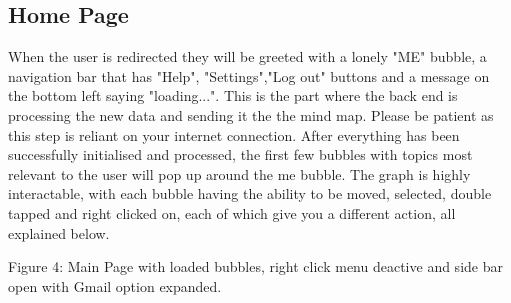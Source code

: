 \documentclass[hidelinks,english]{article}
\begin{document}
	\subsection{Home Page}
	When the user is redirected they will be greeted with a lonely "ME" bubble, a navigation bar that has "Help", "Settings","Log out" buttons and a message on the bottom left saying "loading...". This is the part where the back end is processing the new data and sending it the the mind map. Please be patient as this step is reliant on your internet connection. After everything has been successfully initialised and processed, the first few bubbles with topics most relevant to the user will pop up around the me bubble. The graph is highly interactable, with each bubble having the ability to be moved, selected, double tapped and right clicked on, each of which give you a different action, all explained below. 
    \begin{center}
	  \caption{Figure 4: Main Page with loaded bubbles, right click menu deactive and side bar open with Gmail option expanded.}
	  \label{Main page}
	\end{center}
\end{document}
